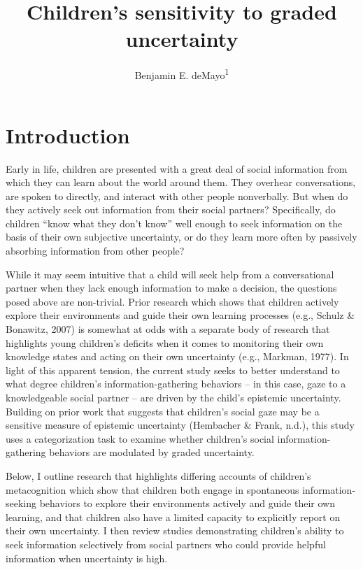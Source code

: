 \documentclass[floatsintext,man]{apa6}
\title{Children's sensitivity to graded uncertainty}
\author{Benjamin E. deMayo\textsuperscript{1}}
\affiliation{
    \vspace{0.5cm}
          \textsuperscript{1} Stanford University  }
\theoremstyle{definition}
\theoremstyle{definition}
\theoremstyle{definition}
\theoremstyle{remark}
\begin{document}
\maketitle

\setcounter{secnumdepth}{0}



\section{Introduction}\label{introduction}

Early in life, children are presented with a great deal of social
information from which they can learn about the world around them. They
overhear conversations, are spoken to directly, and interact with other
people nonverbally. But when do they actively seek out information from
their social partners? Specifically, do children \enquote{know what they
don't know} well enough to seek information on the basis of their own
subjective uncertainty, or do they learn more often by passively
absorbing information from other people?

While it may seem intuitive that a child will seek help from a
conversational partner when they lack enough information to make a
decision, the questions posed above are non-trivial. Prior research
which shows that children actively explore their environments and guide
their own learning processes (e.g., Schulz \& Bonawitz, 2007) is
somewhat at odds with a separate body of research that highlights young
children's deficits when it comes to monitoring their own knowledge
states and acting on their own uncertainty (e.g., Markman, 1977). In
light of this apparent tension, the current study seeks to better
understand to what degree children's information-gathering behaviors --
in this case, gaze to a knowledgeable social partner -- are driven by
the child's epistemic uncertainty. Building on prior work that suggests
that children's social gaze may be a sensitive measure of epistemic
uncertainty (Hembacher \& Frank, n.d.), this study uses a categorization
task to examine whether children's social information-gathering
behaviors are modulated by graded uncertainty.

Below, I outline research that highlights differing accounts of
children's metacognition which show that children both engage in
spontaneous information-seeking behaviors to explore their environments
actively and guide their own learning, and that children also have a
limited capacity to explicitly report on their own uncertainty. I then
review studies demonstrating children's ability to seek information
selectively from social partners who could provide helpful information
when uncertainty is high.
\end{document}

